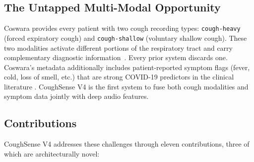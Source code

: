 \documentclass[journal]{IEEEtran}
\begin{document}
\subsection{The Untapped Multi-Modal Opportunity}

Coswara provides every patient with two cough recording types:
\texttt{cough-heavy} (forced expiratory cough) and
\texttt{cough-shallow} (voluntary shallow cough). These two modalities
activate different portions of the respiratory tract and carry
complementary diagnostic information~\cite{shi2018phases}. Every prior
system discards one. Coswara's metadata additionally includes
patient-reported symptom flags (fever, cold, loss of smell, etc.)
that are strong COVID-19 predictors in the clinical literature
\cite{sympnet2022}. CoughSense V4 is the first system to fuse both
cough modalities and symptom data jointly with deep audio features.

\subsection{Contributions}
\label{sec:contribs}

CoughSense V4 addresses these challenges through eleven contributions,
three of which are architecturally novel:
\end{document}
